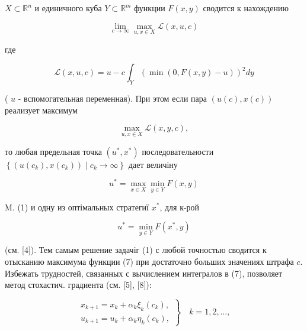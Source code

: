 \documentclass[10pt]{article}
\begin{document}
$X \subset \mathbb{R}^{n}$ и единичного куба $Y \subset \mathbb{R}^{m}$ функции $F(x, y)$ сводится к нахождению



\[

\lim _{c \rightarrow \infty} \max _{u, x \in X} \mathscr{L}(x, u, c)

\]



где



\[

\mathscr{L}(x, u, c)=u-c \int_{Y}(\min (0, F(x, y)-u))^{2} d y

\]



( $u$ - вспомогательная переменная). При этом если пара $(u(c), x(c))$ реализует максимум



\[

\max _{u, x \in X} \mathscr{L}(x, y, c),

\]



то любая предельная точка $\left(u^{*}, x^{*}\right)$ последовательности $\left\{\left(u\left(c_{k}\right), x\left(c_{k}\right)\right) \mid c_{k} \rightarrow \infty\right\}$ дает величіну



\[

u^{*}=\max _{x \in X} \min _{y \in Y} F(x, y)

\]



M. (1) и одну из оптімальных стратегиї $x^{*}$, для к-рой



\[

u^{*}=\min _{y \in Y} F\left(x^{*}, y\right)

\]



(см. [4]). Тем самым решение задачіг (1) с любой точностью сводится к отысканию максимума функции (7) при достаточно больших значениях штрафа $c$. Избежать трудностей, связанных с вычислением интегралов в (7), позволяет метод стохастич. градиента (см. [5], [8]):



\[

\left.\begin{array}{l}

x_{k+1}=x_{k}+\alpha_{k} \xi_{k}\left(c_{k}\right), \\

u_{k+1}=u_{k}+\alpha_{k} \eta_{k}\left(c_{k}\right),

\end{array}\right\} \quad k=1,2, \ldots,

\]
\end{document}
